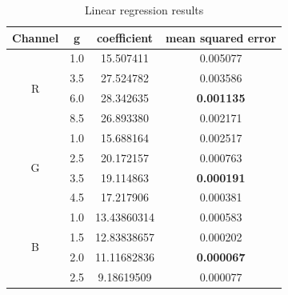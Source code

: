 \documentclass[10pt,twocolumn,letterpaper]{article}
\begin{document}
\begin{table}[]
\caption{Linear regression results}
\centering
\begin{tabular}{|c|c|c|c|}
\hline
\hline
Channel &  g  &  coefficient & mean squared error  \\
\hline
 \multirow{4}{*}{R} &  1.0  & 15.507411  &  0.005077  \\
 \cline{2-4}
&3.5&27.524782&0.003586\\
 \cline{2-4}
&6.0&28.342635&\textbf{0.001135}\\
 \cline{2-4}
&8.5&26.893380&0.002171\\
 \hline
 \multirow{4}{*}{G} &  1.0 &15.688164&0.002517\\
 \cline{2-4}
&2.5&20.172157&0.000763\\
 \cline{2-4}
&3.5&19.114863&\textbf{0.000191}\\
 \cline{2-4}
&4.5&17.217906&0.000381\\
 \hline
 \multirow{4}{*}{B} &1.0&13.43860314&0.000583\\
 \cline{2-4}
&1.5&12.83838657&0.000202\\
 \cline{2-4}
&2.0&11.11682836&\textbf{0.000067}\\
 \cline{2-4}
&2.5&9.18619509&0.000077\\
 \hline

\end{tabular}
\label{tab:linear}
\end{table}
\end{document}
